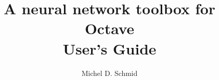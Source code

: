 
\title{A neural network toolbox for Octave\\
		User's Guide \\
				}

\author{Michel D. Schmid}
\maketitle
